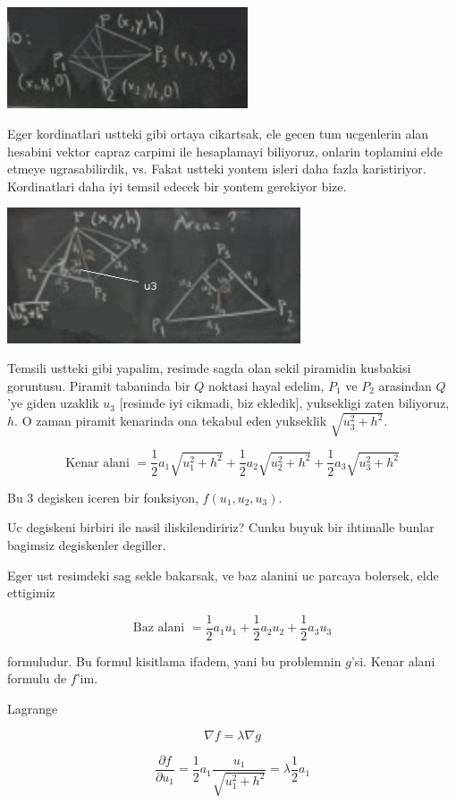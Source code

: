 \documentclass[12pt,fleqn]{article}
\begin{document}
\includegraphics[height=3cm]{13_9.png}

Eger kordinatlari ustteki gibi ortaya cikartsak, ele gecen tum ucgenlerin
alan hesabini vektor capraz carpimi ile hesaplamayi biliyoruz, onlarin
toplamini elde etmeye ugrasabilirdik, vs. Fakat ustteki yontem isleri daha
fazla karistiriyor. Kordinatlari daha iyi temsil edecek bir yontem
gerekiyor bize.

\includegraphics[height=4cm]{13_10.png}

Temsili ustteki gibi yapalim, resimde sagda olan sekil piramidin kusbakisi
goruntusu. Piramit tabaninda bir $Q$ noktasi hayal edelim, $P_1$  ve $P_2$
arasindan $Q$'ye giden uzaklik $u_3$ [resimde iyi cikmadi, biz ekledik],
yuksekligi zaten biliyoruz, $h$. O zaman piramit kenarinda ona tekabul eden
yukseklik $\sqrt{u_3^2 + h^2}$. 

\[ \textrm{Kenar alani } = 
\frac{1}{2}a_1 \sqrt{u_1^2 + h^2} + 
\frac{1}{2}a_2 \sqrt{u_2^2 + h^2} + 
\frac{1}{2}a_3 \sqrt{u_3^2 + h^2} 
 \]

Bu 3 degisken iceren bir fonksiyon, $f(u_1,u_2,u_3)$. 

Uc degiskeni birbiri ile nasil iliskilendiririz? Cunku buyuk bir ihtimalle
bunlar bagimsiz degiskenler degiller.

Eger ust resimdeki sag sekle bakarsak, ve baz alanini uc parcaya bolersek,
elde ettigimiz

\[ \textrm{Baz alani } = 
\frac{1}{2}a_1u_1 +  
\frac{1}{2}a_2u_2 +  
\frac{1}{2}a_3u_3
\]

formuludur. Bu formul kisitlama ifadem, yani bu problemnin $g$'si. Kenar
alani formulu de $f$'im. 

Lagrange

\[ \nabla f = \lambda \nabla g \]

\[ \frac{\partial f}{\partial u_1} =
\frac{1}{2}a_1 \frac{u_1}{\sqrt{u_1^2 + h^2}} = 
\lambda \frac{1}{2}a_1
\]
\end{document}
